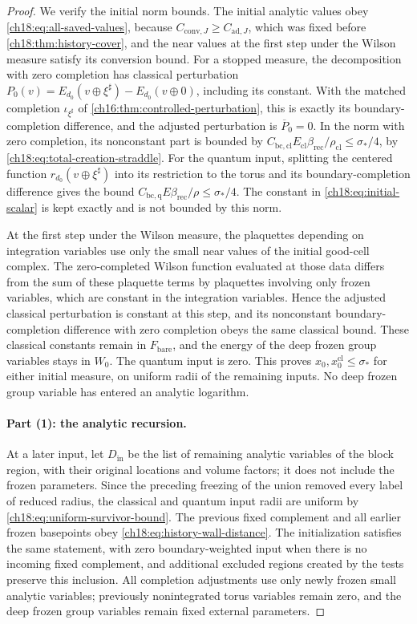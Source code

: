 \begin{proof}
We verify the initial norm bounds. The initial analytic values obey \eqref{ch18:eq:all-saved-values}, because $C_{\mathrm{conv},J}\ge C_{\mathrm{ad},J}$, which was fixed before \cref{ch18:thm:history-cover}, and the near values at the first step under the Wilson measure satisfy its conversion bound. For a stopped measure, the decomposition with zero completion has classical perturbation $P_0(v)=E_{d_0}(v\oplus\xi^\sharp)-E_{d_0}(v\oplus0)$, including its constant. With the matched completion $\iota_{\xi^\sharp}$ of \cref{ch16:thm:controlled-perturbation}, this is exactly its boundary-completion difference, and the adjusted perturbation is $\overline P_0=0$. In the norm with zero completion, its nonconstant part is bounded by $C_{\mathrm{bc},\mathrm{cl}}E_{\mathrm{cl}}\beta_{\mathrm{rec}}/\rho_{\mathrm{cl}}\le\sigma_*/4$, by \eqref{ch18:eq:total-creation-straddle}. For the quantum input, splitting the centered function $r_{d_0}(v\oplus\xi^\sharp)$ into its restriction to the torus and its boundary-completion difference gives the bound $C_{\mathrm{bc},\mathrm q}E\beta_{\mathrm{rec}}/\rho\le\sigma_*/4$. The constant in \eqref{ch18:eq:initial-scalar} is kept exactly and is not bounded by this norm.

At the first step under the Wilson measure, the plaquettes depending on integration variables use only the small near values of the initial good-cell complex. The zero-completed Wilson function evaluated at those data differs from the sum of these plaquette terms by plaquettes involving only frozen variables, which are constant in the integration variables. Hence the adjusted classical perturbation is constant at this step, and its nonconstant boundary-completion difference with zero completion obeys the same classical bound. These classical constants remain in $F_{\mathrm{bare}}$, and the energy of the deep frozen group variables stays in $W_0$. The quantum input is zero. This proves $x_0,x_0^{\mathrm{cl}}\le\sigma_*$ for either initial measure, on uniform radii of the remaining inputs. No deep frozen group variable has entered an analytic logarithm.

\paragraph{Part (1): the analytic recursion.}
At a later input, let $D_{\mathrm{in}}$ be the list of remaining analytic variables of the block region, with their original locations and volume factors; it does not include the frozen parameters. Since the preceding freezing of the union removed every label of reduced radius, the classical and quantum input radii are uniform by \eqref{ch18:eq:uniform-survivor-bound}. The previous fixed complement and all earlier frozen basepoints obey \eqref{ch18:eq:history-wall-distance}. The initialization satisfies the same statement, with zero boundary-weighted input when there is no incoming fixed complement, and additional excluded regions created by the tests preserve this inclusion. All completion adjustments use only newly frozen small analytic variables; previously nonintegrated torus variables remain zero, and the deep frozen group variables remain fixed external parameters.


\end{proof}
